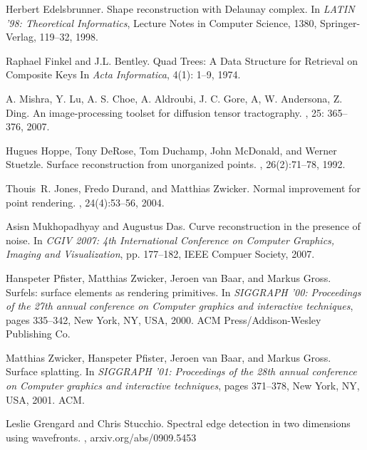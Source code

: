 \documentclass{article}
\numberwithin{cntr}{section}
\numberwithin{equation}{section}
\begin{document}
\begin{thebibliography}{99}
Herbert Edelsbrunner.
\newblock Shape reconstruction with Delaunay complex.
\newblock In {\em LATIN '98: Theoretical Informatics}, Lecture Notes
in Computer Science, 1380, Springer-Verlag, 119--32, 1998.

Raphael Finkel and J.L. Bentley.
\newblock Quad Trees: A Data Structure for Retrieval on Composite Keys
\newblock In {\em Acta Informatica}, 4(1): 1--9, 1974.

A. Mishra, Y. Lu, A. S. Choe, A. Aldroubi, J. C. Gore,
A, W. Andersona, Z. Ding.
\newblock An image-processing toolset for diffusion tensor tractography.
, 25: 365--376, 2007.

Hugues Hoppe, Tony DeRose, Tom Duchamp, John McDonald, and Werner Stuetzle.
\newblock Surface reconstruction from unorganized points.
, 26(2):71--78, 1992.

Thouis~R. Jones, Fredo Durand, and Matthias Zwicker.
\newblock Normal improvement for point rendering.
, 24(4):53--56, 2004.

Asisn Mukhopadhyay and Augustus Das.
\newblock Curve reconstruction in the presence of noise.
\newblock In {\em CGIV 2007: 4th International Conference on
Computer Graphics, Imaging and Visualization}, pp. 177--182,
IEEE Compuer Society, 2007.

Hanspeter Pfister, Matthias Zwicker, Jeroen van Baar, and Markus Gross.
\newblock Surfels: surface elements as rendering primitives.
\newblock In {\em SIGGRAPH '00: Proceedings of the 27th annual conference on
  Computer graphics and interactive techniques}, pages 335--342, New York, NY,
  USA, 2000. ACM Press/Addison-Wesley Publishing Co.

Matthias Zwicker, Hanspeter Pfister, Jeroen van Baar, and Markus Gross.
\newblock Surface splatting.
\newblock In {\em SIGGRAPH '01: Proceedings of the 28th annual conference on
  Computer graphics and interactive techniques}, pages 371--378, New York, NY,
  USA, 2001. ACM.

Leslie Grengard and Chris Stucchio.
\newblock Spectral edge detection in two dimensions using
wavefronts.
, arxiv.org/abs/0909.5453


\end{thebibliography}
\end{document}
